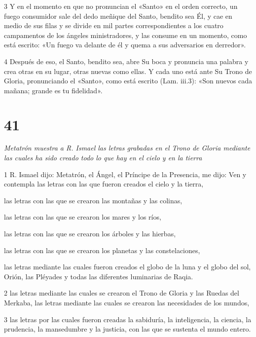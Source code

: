 \par 3 Y en el momento en que no pronuncian el «Santo» en el orden correcto, un fuego consumidor sale del dedo meñique del Santo, bendito sea Él, y cae en medio de sus filas y se divide en mil partes correspondientes a los cuatro campamentos de los ángeles ministradores, y las consume en un momento, como está escrito: «Un fuego va delante de él y quema a sus adversarios en derredor».

\par 4 Después de eso, el Santo, bendito sea, abre Su boca y pronuncia una palabra y crea otras en su lugar, otras nuevas como ellas. Y cada uno está ante Su Trono de Gloria, pronunciando el «Santo», como está escrito (Lam. iii.3): «Son nuevos cada mañana; grande es tu fidelidad».


\chapter{41}

\par \textit{Metatrón muestra a R. Ismael las letras grabadas en el Trono de Gloria mediante las cuales ha sido creado todo lo que hay en el cielo y en la tierra}

\par 1 R. Ismael dijo: Metatrón, el Ángel, el Príncipe de la Presencia, me dijo: Ven y contempla las letras con las que fueron creados el cielo y la tierra,
\par las letras con las que se crearon las montañas y las colinas,
\par las letras con las que se crearon los mares y los ríos,
\par las letras con las que se crearon los árboles y las hierbas,
\par las letras con las que se crearon los planetas y las constelaciones,
\par las letras mediante las cuales fueron creados el globo de la luna y el globo del sol, Orión, las Pléyades y todas las diferentes luminarias de Raqia.

\par 2 las letras mediante las cuales se crearon el Trono de Gloria y las Ruedas del Merkaba, las letras mediante las cuales se crearon las necesidades de los mundos,

\par 3 las letras por las cuales fueron creadas la sabiduría, la inteligencia, la ciencia, la prudencia, la mansedumbre y la justicia, con las que se sustenta el mundo entero.

